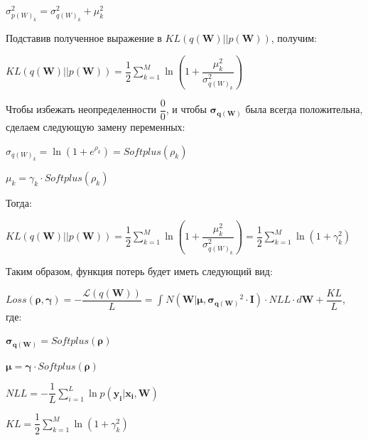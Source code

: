 \documentclass{article}
\begin{document}
$
\sigma_{{p(W)_{k}}}^2 = \sigma_{{q(W)_{k}}}^2 + \mu_{k}^2
$

Подставив полученное выражение в $KL(q(\mathbf{W}) || p(\mathbf{W}))$, получим:

$
KL(q(\mathbf{W}) || p(\mathbf{W})) =
\dfrac{1}{2}\sum_{k=1}^{M}\ln({1 + \dfrac{\mu_{k}^2}{\sigma_{{q(W)_{k}}}^2}})
$

Чтобы избежать неопределенности $\dfrac{0}{0}$, и чтобы $\pmb{\sigma_{q(\mathbf{W})}}$ была всегда положительна, сделаем следующую замену переменных:

$\sigma_{{q(W)_{k}}} = \ln({1 + e^{\rho_{k}}}) = Softplus(\rho_{k})$

$\mu_{k} = \gamma_{k} \cdot Softplus(\rho_{k})$

Тогда:

$
KL(q(\mathbf{W}) || p(\mathbf{W})) =
\dfrac{1}{2}\sum_{k=1}^{M}\ln({1 + \dfrac{\mu_{k}^2}{\sigma_{{q(W)_{k}}}^2}}) =
\dfrac{1}{2}\sum_{k=1}^{M}\ln({1 + \gamma_{k}^{2}})
$

Таким образом, функция потерь будет иметь следующий вид:

$
Loss(\pmb{\rho}, \pmb{\gamma}) =
- \dfrac{\mathcal{L}(q(\mathbf{W}))}{L} =
\int_{}{} N(\mathbf{W} | \pmb{\mu}, \pmb{\sigma_{q(\mathbf{W})}}^{2} \cdot \mathbf{I}) \cdot NLL \cdot d\mathbf{W} + \dfrac{KL}{L}
$, где:

$\pmb{\sigma_{q(\mathbf{W})}} = Softplus(\pmb{\rho})$

$\pmb{\mu} = \pmb{\gamma} \cdot Softplus(\pmb{\rho})$

$NLL = -\dfrac{1}{L}\sum_{i=1}^{L}{\ln{p( \mathbf{y_{i}} | \mathbf{x_{i}}, \mathbf{W})}}$

$KL = \dfrac{1}{2}\sum_{k=1}^{M}\ln({1 + \gamma_{k}^{2}})$
\end{document}

